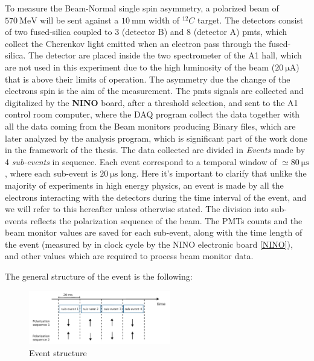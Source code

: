 To measure the Beam-Normal single spin asymmetry, a polarized beam of $ \SI{570}{\mega \electronvolt}$ will be sent against a $\SI{10}{\milli \meter}$ width of $^{12}C$ target. The detectors consist of two fused-silica coupled to 3 (detector B) and 8 (detector A) pmts, which collect the Cherenkov light emitted when an electron pass through the fused-silica. 
The detector are placed inside the two spectrometer of the A1 hall, which are not used in this experiment due to the high luminosity of the beam ($ \SI{20}{\micro \ampere}$) that is above their limits of operation. 
The asymmetry due the change of the electrons spin is the aim of the measurement. The pmts signals are collected and digitalized by the \textbf{NINO} board, after a threshold selection, and sent to the A1 control room computer, where the DAQ program collect the data together with all the data coming from the Beam monitors producing Binary files, which are later analyzed by the analysis program, which is significant part of the work done in the framework of the thesis. 
The data collected are divided in \textit{Events} made by 4 \textit{sub-events} in sequence. Each event correspond to a temporal window of $\simeq \SI{80}{\micro \second}$, where each sub-event is $\SI{20}{\micro \second}$ long. Here it's important to clarify that unlike the majority of experiments in high energy physics, an event is made by all the electrons interacting with the detectors during the time interval of the event, and we will refer to this hereafter unless otherwise stated. The division into sub-events reflects the polarization sequence of the beam. The PMTs counts and the beam monitor values are saved for each sub-event, along with the time length of the event (measured by in clock cycle by the NINO electronic board \ref{NINO}), and other values which are required to process beam monitor data.

The general structure of the event is the following: 

\begin{figure}[hbtp] 
\centering
\includegraphics[width = 0.55\textwidth]{ExperimentalSetup/EventStructure.pdf}
\caption{Event structure}
\label{fig:EventStructure}
\end{figure}

